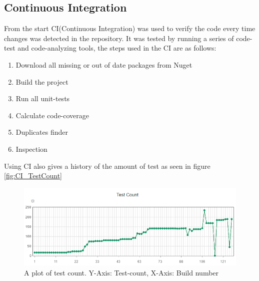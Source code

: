 \subsection{Continuous Integration}

From the start CI(Continuous Integration) was used to verify the code every time changes was detected in the repository. It was tested by running a series of code-test and code-analyzing tools, the steps used in the CI are as follows:

\begin{enumerate}
	\item Download all missing or out of date packages from Nuget
	\item Build the project
	\item Run all unit-tests
	\item Calculate code-coverage
	\item Duplicates finder
	\item Inspection
\end{enumerate}

Using CI also gives a history of the amount of test as seen in figure \vref{fig:CI_TestCount}

\begin{figure}[H]
\centering
\includegraphics[width=0.95\linewidth]{SubPages/Images/CI_TestCount}
\caption{A plot of test count. Y-Axis: Test-count, X-Axis: Build number}
\label{fig:CI_TestCount}
\end{figure}
